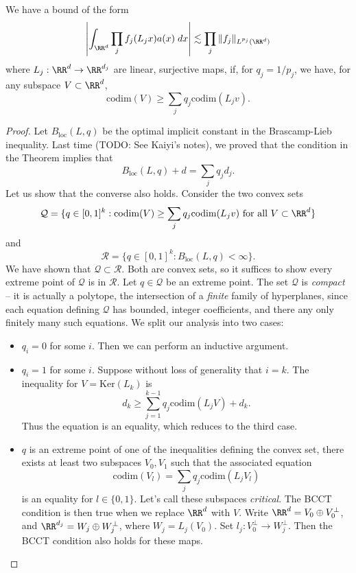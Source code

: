 \begin{theorem}[BCCT]
    We have a bound of the form
    \[ \left| \int_{\RR^d} \prod_j f_j(L_j x) a(x)\; dx \right| \lesssim \prod_j \| f_j \|_{L^{p_j}(\RR^d)} \]
    where $L_j: \RR^d \to \RR^{d_j}$ are linear, surjective maps, if, for $q_j = 1/p_j$, we have, for any subspace $V \subset \RR^d$,
    \[ \text{codim}(V) \geq \sum_j q_j \text{codim}(L_j v). \]
\end{theorem}
\begin{proof}
    Let $B_{\text{loc}}(L,q)$ be the optimal implicit constant in the Brascamp-Lieb inequality. Last time (TODO: See Kaiyi's notes), we proved that the condition in the Theorem implies that
    \[ B_{\text{loc}}(L,q) + d = \sum_j q_j d_j. \]
    Let us show that the converse also holds. Consider the two convex sets
    \[ \mathcal{Q} = \{ q \in [0,1]^k : \text{codim}(V) \geq \sum_j q_j \text{codim}(L_j v)\ \text{for all $V \subset \RR^d$} \} \]
    and
    \[ \mathcal{R} = \{ q \in [0,1]^k : B_{\text{loc}}(L,q) < \infty \}. \]
    We have shown that $\mathcal{Q} \subset \mathcal{R}$. Both are convex sets, so it suffices to show every extreme point of $\mathcal{Q}$ is in $\mathcal{R}$. Let $q \in \mathcal{Q}$ be an extreme point. The set $\mathcal{Q}$ is \emph{compact} -- it is actually a polytope, the intersection of a \emph{finite} family of hyperplanes, since each equation defining $\mathcal{Q}$ has bounded, integer coefficients, and there any only finitely many such equations. We split our analysis into two cases:
    \begin{itemize}
        \item $q_i = 0$ for some $i$. Then we can perform an inductive argument.

        \item $q_i = 1$ for some $i$. Suppose without loss of generality that $i = k$. The inequality for $V = \text{Ker}(L_k)$ is
        \[ d_k \geq \sum_{j = 1}^{k-1} q_j \text{codim}(L_j V) + d_k. \]
        Thus the equation is an equality, which reduces to the third case.

        \item $q$ is an extreme point of one of the inequalities defining the convex set, there exists at least two subspaces $V_0, V_1$ such that the associated equation
        \[ \text{codim}(V_l) = \sum_j q_j \text{codim}(L_j V_l) \]
        is an equality for $l \in \{ 0, 1 \}$. Let's call these subspaces \emph{critical}. The BCCT condition is then true when we replace $\RR^d$ with $V$. Write $\RR^d = V_0 \oplus V_0^\perp$, and $\RR^{d_j} = W_j \oplus W_j^\perp$, where $W_j = L_j(V_0)$. Set $l_j: V_0^\perp \to W_j^\perp$. Then the BCCT condition also holds for these maps.


\end{itemize}
\end{proof}
